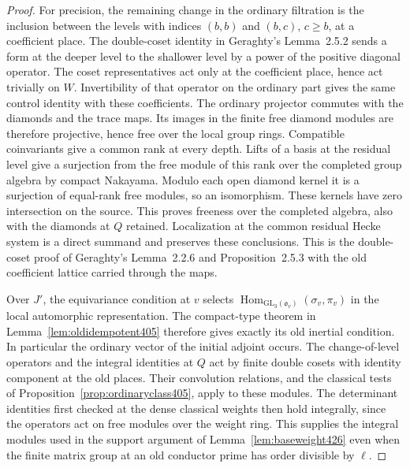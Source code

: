 \documentclass[a4paper,11pt]{article}
\theoremstyle{definition}
\theoremstyle{remark}
\numberwithin{equation}{section}
\begin{document}
\begin{proof}
For precision, the remaining change in the ordinary filtration
is the inclusion between the levels with indices \((b,b)\)
and \((b,c)\), \(c\ge b\), at a coefficient place. The
double-coset identity in Geraghty's Lemma~2.5.2 sends a form
at the deeper level to the shallower level by a power of the
positive diagonal operator. The coset representatives act
only at the coefficient place, hence act trivially on \(W\).
Invertibility of that operator on the ordinary part gives the
same control identity with these coefficients. The ordinary
projector commutes with the diamonds and the trace maps.
Its images in the finite free diamond modules are therefore
projective, hence free over the local group rings. Compatible
coinvariants give a common rank at every depth. Lifts of a
basis at the residual level give a surjection from the free
module of this rank over the completed group algebra by
compact Nakayama. Modulo each open diamond kernel it is a
surjection of equal-rank free modules, so an isomorphism.
These kernels have zero intersection on the source. This proves
freeness over the completed algebra, also with the diamonds
at \(Q\) retained. Localization at the common residual Hecke
system is a direct summand and preserves these conclusions.
This is the double-coset proof of Geraghty's Lemma~2.2.6 and
Proposition~2.5.3 with the old coefficient lattice carried
through the maps.~\cite{XI-VIII-geraghty363}

Over \(J'\), the equivariance condition at \(v\) selects
\(\operatorname{Hom}_{\mathrm{GL}_3(\mathfrak o_v)}
(\sigma_v,\pi_v)\) in the local automorphic representation.
The compact-type theorem in Lemma~\ref{lem:oldidempotent405}
therefore gives exactly its old inertial condition. In
particular the ordinary vector of the initial adjoint occurs.
The change-of-level operators and the integral identities
at \(Q\) act by finite double cosets with identity component
at the old places. Their convolution relations, and the
classical tests of Proposition~\ref{prop:ordinaryclass405},
apply to these modules. The determinant identities first
checked at the dense classical weights then hold integrally,
since the operators act on free modules over the weight ring.
This supplies the integral modules used in the support argument
of Lemma~\ref{lem:baseweight426} even when the finite matrix
group at an old conductor prime has order divisible by \(\ell\).
\end{proof}
\end{document}
